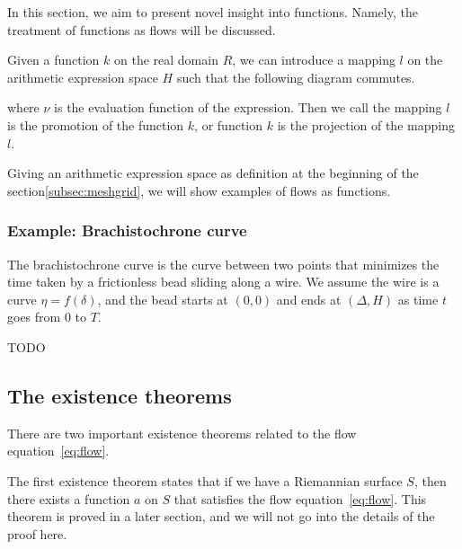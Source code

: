 In this section, we aim to present novel insight into functions.
Namely, the treatment of functions as flows will be discussed.

\begin{definition}\label{def:projection}
Given a function $k$ on the real domain $R$, we can introduce a mapping $l$ on the arithmetic expression space $H$ such that the following diagram commutes.

\begin{center}
\end{center}

where $\nu$ is the evaluation function of the expression. Then we call the mapping $l$ is the promotion of the function $k$,
or function $k$ is the projection of the mapping $l$.
\end{definition}

Giving an arithmetic expression space as definition at the beginning of the section\ref{subsec:meshgrid},
we will show examples of flows as functions.

\subsubsection{Example: Brachistochrone curve}\label{subsubsec:brachistochrone}

The brachistochrone curve is the curve between two points that minimizes the time taken by a frictionless bead sliding along a wire.
We assume the wire is a curve $\eta = f(\delta)$, and the bead starts at $(0, 0)$ and ends at $( \Delta, H )$ as time $t$ goes from $0$ to $T$.

TODO

\subsection{The existence theorems}\label{subsec:existence-theorems}

There are two important existence theorems related to the flow equation~\eqref{eq:flow}.

The first existence theorem states that if we have a Riemannian surface $S$, then there exists a function $a$ on $S$ that satisfies the flow equation~\eqref{eq:flow}. This theorem is proved in a later section, and we will not go into the details of the proof here.

